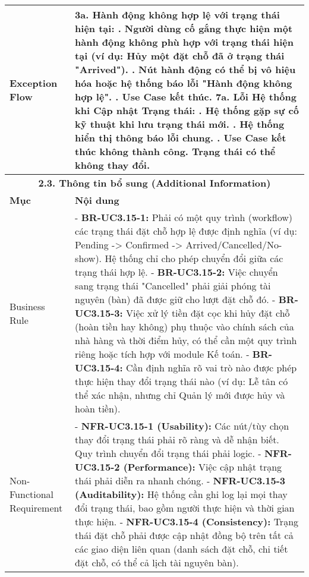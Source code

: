 \begin{longtable}{|m{4cm}|p{11cm}|}
Exception Flow & \textbf{3a. Hành động không hợp lệ với trạng thái hiện tại:} \newline    1. Người dùng cố gắng thực hiện một hành động không phù hợp với trạng thái hiện tại (ví dụ: Hủy một đặt chỗ đã ở trạng thái "Arrived"). \newline    2. Nút hành động có thể bị vô hiệu hóa hoặc hệ thống báo lỗi "Hành động không hợp lệ". \newline    3. Use Case kết thúc. \newline \textbf{7a. Lỗi Hệ thống khi Cập nhật Trạng thái:} \newline    1. Hệ thống gặp sự cố kỹ thuật khi lưu trạng thái mới. \newline    2. Hệ thống hiển thị thông báo lỗi chung. \newline    3. Use Case kết thúc không thành công. Trạng thái có thể không thay đổi. \\
\hline
\multicolumn{2}{|c|}{\textbf{2.3. Thông tin bổ sung (Additional Information)}} \\
\hline
\textbf{Mục} & \textbf{Nội dung} \\
\hline
Business Rule & - \textbf{BR-UC3.15-1:} Phải có một quy trình (workflow) các trạng thái đặt chỗ hợp lệ được định nghĩa (ví dụ: Pending -> Confirmed -> Arrived/Cancelled/No-show). Hệ thống chỉ cho phép chuyển đổi giữa các trạng thái hợp lệ. \newline - \textbf{BR-UC3.15-2:} Việc chuyển sang trạng thái "Cancelled" phải giải phóng tài nguyên (bàn) đã được giữ cho lượt đặt chỗ đó. \newline - \textbf{BR-UC3.15-3:} Việc xử lý tiền đặt cọc khi hủy đặt chỗ (hoàn tiền hay không) phụ thuộc vào chính sách của nhà hàng và thời điểm hủy, có thể cần một quy trình riêng hoặc tích hợp với module Kế toán. \newline - \textbf{BR-UC3.15-4:} Cần định nghĩa rõ vai trò nào được phép thực hiện thay đổi trạng thái nào (ví dụ: Lễ tân có thể xác nhận, nhưng chỉ Quản lý mới được hủy và hoàn tiền). \\
\hline
Non-Functional Requirement & - \textbf{NFR-UC3.15-1 (Usability):} Các nút/tùy chọn thay đổi trạng thái phải rõ ràng và dễ nhận biết. Quy trình chuyển đổi trạng thái phải logic. \newline - \textbf{NFR-UC3.15-2 (Performance):} Việc cập nhật trạng thái phải diễn ra nhanh chóng. \newline - \textbf{NFR-UC3.15-3 (Auditability):} Hệ thống cần ghi log lại mọi thay đổi trạng thái, bao gồm người thực hiện và thời gian thực hiện. \newline - \textbf{NFR-UC3.15-4 (Consistency):} Trạng thái đặt chỗ phải được cập nhật đồng bộ trên tất cả các giao diện liên quan (danh sách đặt chỗ, chi tiết đặt chỗ, có thể cả lịch tài nguyên bàn). \\
\hline
\end{longtable}

